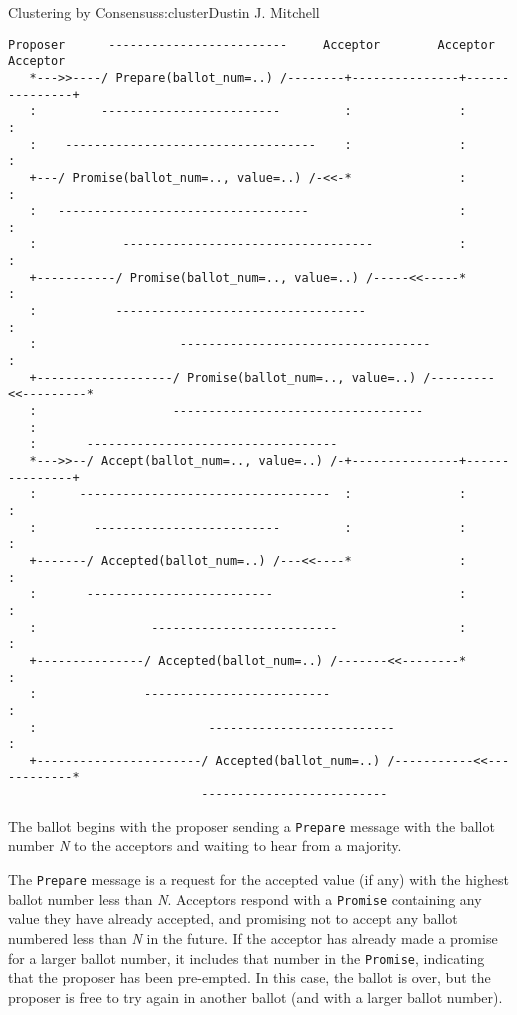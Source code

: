 \begin{aosachapter}{Clustering by Consensus}{s:cluster}{Dustin J. Mitchell}
\begin{verbatim}
Proposer      -------------------------     Acceptor        Acceptor        Acceptor
   *--->>----/ Prepare(ballot_num=..) /--------+---------------+---------------+
   :         -------------------------         :               :               :
   :    -----------------------------------    :               :               :
   +---/ Promise(ballot_num=.., value=..) /-<<-*               :               :
   :   -----------------------------------                     :               :
   :            -----------------------------------            :               :
   +-----------/ Promise(ballot_num=.., value=..) /-----<<-----*               :
   :           -----------------------------------                             :
   :                    -----------------------------------                    :
   +-------------------/ Promise(ballot_num=.., value=..) /---------<<---------*
   :                   -----------------------------------      
   :
   :       -----------------------------------
   *--->>--/ Accept(ballot_num=.., value=..) /-+---------------+---------------+
   :      -----------------------------------  :               :               :
   :        --------------------------         :               :               :
   +-------/ Accepted(ballot_num=..) /---<<----*               :               :
   :       --------------------------                          :               :
   :                --------------------------                 :               :
   +---------------/ Accepted(ballot_num=..) /-------<<--------*               :
   :               --------------------------                                  :
   :                        --------------------------                         :
   +-----------------------/ Accepted(ballot_num=..) /-----------<<------------*
                           --------------------------      
\end{verbatim}

The ballot begins with the proposer sending a \texttt{Prepare} message
with the ballot number \emph{N} to the acceptors and waiting to hear
from a majority.

The \texttt{Prepare} message is a request for the accepted value (if
any) with the highest ballot number less than \emph{N}. Acceptors
respond with a \texttt{Promise} containing any value they have already
accepted, and promising not to accept any ballot numbered less than
\emph{N} in the future. If the acceptor has already made a promise for a
larger ballot number, it includes that number in the \texttt{Promise},
indicating that the proposer has been pre-empted. In this case, the
ballot is over, but the proposer is free to try again in another ballot
(and with a larger ballot number).


\end{aosachapter}
